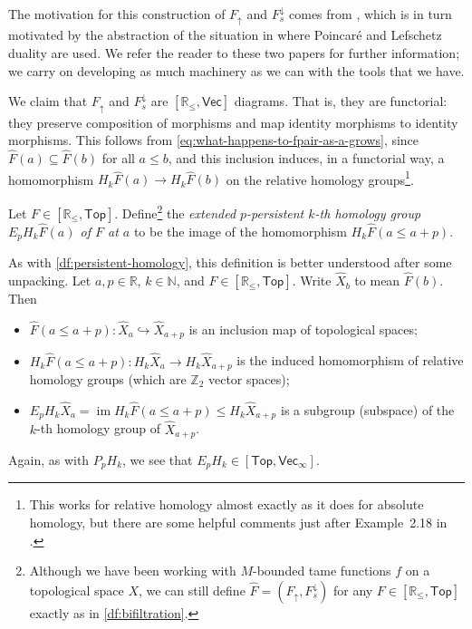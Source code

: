\documentclass[12pt]{article}
\numberwithin{equation}{subsection}
\numberwithin{theorem}{subsection}
\numberwithin{lemma}{subsection}
\numberwithin{corollary}{subsection}
\numberwithin{definition}{subsection}
\numberwithin{example}{subsection}
\numberwithin{note}{subsection}
\newcommand{\zz}{\mathbb{Z}}
\newcommand{\rr}{\mathbb{R}}
\newcommand{\nn}{\mathbb{N}}
\DeclareMathOperator{\im}{im}
\newcommand{\rrleq}{\rr_\leqslant}
\newcommand{\Vecrrdiag}{[\rr_\leqslant,\mathsf{Vec}]}
\newcommand{\Top}{\mathsf{Top}}
\newcommand{\Fup}{F_\uparrow}
\newcommand{\Fdown}{F^\downarrow_s}
\begin{document}
        The motivation for this construction of $\Fup$ and $\Fdown$ comes from \cite[\S6]{Bubenik:dn}, which is in turn motivated by the abstraction of the situation in \cite[\S4]{CohenSteiner:2009ho} where Poincaré and Lefschetz duality are used.
        We refer the reader to these two papers for further information; we carry on developing as much machinery as we can with the tools that we have.

        \bigskip

        We claim that $\Fup$ and $\Fdown$ are $\Vecrrdiag$ diagrams.
        That is, they are functorial: they preserve composition of morphisms and map identity morphisms to identity morphisms.
        This follows from \cref{eq:what-happens-to-fpair-as-a-grows}, since $\widehat{F}(a)\subseteq\widehat{F}(b)$ for all $a\leqslant b$, and this inclusion induces, in a functorial way, a homomorphism $H_k\widehat{F}(a)\to H_k\widehat{F}(b)$ on the relative homology groups\footnote{
            This works for relative homology almost exactly as it does for absolute homology, but there are some helpful comments just after Example~2.18 in \cite[118]{hatcher2002algebraic}.
        }.

        \begin{definition}
            Let $F\in[\rrleq,\Top]$.
            Define\footnote{
                Although we have been working with $M$-bounded tame functions $f$ on a topological space $X$, we can still define $\widehat{F}=(\Fup,\Fdown)$ for any $F\in[\rrleq,\Top]$ exactly as in \cref{df:bifiltration}.
            } the \emph{extended $p$-persistent $k$-th homology group $E_pH_k\widehat{F}(a)$ of $F$ at $a$} to be the image of the homomorphism $H_k\widehat{F}(a\leqslant a+p)$.
        \end{definition}

        As with \cref{df:persistent-homology}, this definition is better understood after some unpacking.
        Let $a,p\in\rr$, $k\in\nn$, and $F\in[\rrleq,\Top]$.
        Write $\widehat{X}_b$ to mean $\widehat{F}(b)$.
        Then
        \begin{itemize}
            \item $\widehat{F}(a\leqslant a+p)\colon\widehat{X}_a\hookrightarrow\widehat{X}_{a+p}$ is an inclusion map of topological spaces;
            \item $H_k\widehat{F}(a\leqslant a+p)\colon H_k\widehat{X}_a\to H_k\widehat{X}_{a+p}$ is the induced homomorphism of relative homology groups (which are $\zz_2$ vector spaces);
            \item $E_pH_k\widehat{X}_a=\im H_k\widehat{F}(a\leqslant a+p)\leqslant H_k\widehat{X}_{a+p}$ is a subgroup (subspace) of the $k$-th homology group of $\widehat{X}_{a+p}$.
        \end{itemize}
        Again, as with $P_pH_k$, we see that $E_pH_k\in[\Top,\mathsf{Vec}_\infty]$.
\end{document}
